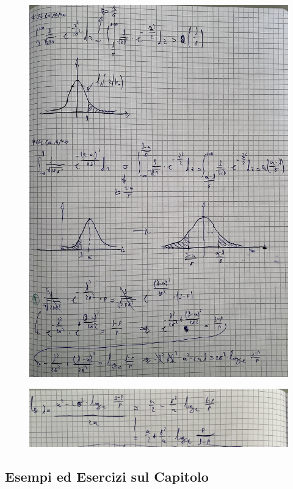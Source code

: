 \documentclass{article}
\begin{document}
\begin{figure}[ht]
\centering
\includegraphics[scale=0.10]{ese/24e.jpeg}
\end{figure} 
\begin{figure}[ht]
\centering
\includegraphics[scale=0.10]{ese/24f.jpeg}
\end{figure} 

\subsection{Esempi ed Esercizi sul Capitolo}
\end{document}

